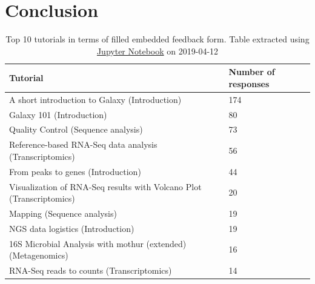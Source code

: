 \documentclass[10pt,letterpaper]{article}
\begin{document}
\section*{Conclusion}



\begin{table}[]
	\centering
	\caption{Top 10 tutorials in terms of filled embedded feedback form. Table extracted using \href{https://github.com/bebatut/galaxy-training-material-stats/blob/master/src/extract_repo_content_stats.ipynb}{Jupyter Notebook} on 2019-04-12\label{tbl:toptentutorials}}
	\begin{tabular}{p{}p{}}
		Tutorial                                                             & Number of responses \\\hline
		A short introduction to Galaxy (Introduction)                        & 174 \\
		Galaxy 101 (Introduction)                                            & 80 \\
		Quality Control (Sequence analysis)                                  & 73 \\
		Reference-based RNA-Seq data analysis (Transcriptomics)              & 56 \\
		From peaks to genes (Introduction)                                   & 44 \\
		Visualization of RNA-Seq results with Volcano Plot (Transcriptomics) & 20 \\
		Mapping (Sequence analysis)                                          & 19 \\
		NGS data logistics (Introduction)                                    & 19 \\
		16S Microbial Analysis with mothur (extended) (Metagenomics)         & 16 \\
		RNA-Seq reads to counts (Transcriptomics)                            & 14
	\end{tabular}
\end{table}
\end{document}

